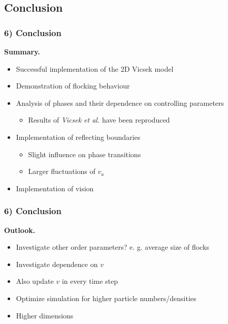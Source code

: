 \subsection{Conclusion}

\begin{frame}
	\frametitle{6) Conclusion}
	\textbf{Summary.}
	\begin{itemize}
	    \item Successful implementation of the 2D Vicsek model
	    \item Demonstration of flocking behaviour
	    \item Analysis of phases and their dependence on controlling parameters 
	    	\begin{itemize}
	    		\item Results of \textit{Vicsek et al.} have been reproduced
	    	\end{itemize}
	    \item Implementation of reflecting boundaries
	    	\begin{itemize}
	    		\item Slight influence on phase transitions
	    		\item Larger fluctuations of $v_a$
	    	\end{itemize}
	    \item Implementation of vision
	\end{itemize}
\end{frame}

\begin{frame}
	\frametitle{6) Conclusion}
	\textbf{Outlook.}
	\begin{itemize}
	    \item Investigate other order parameters? e. g. average size of flocks
	    \item Investigate dependence on $v$
	    \item Also update $v$ in every time step
	    \item Optimize simulation for higher particle numbers/densities
	    \item Higher dimensions
	\end{itemize}
\end{frame}